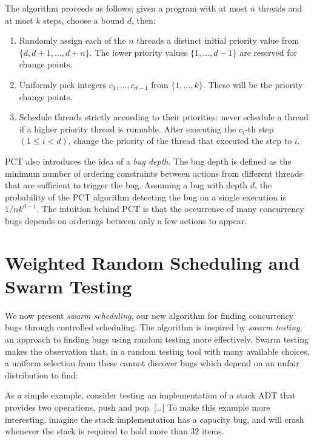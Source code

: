 The algorithm proceeds as follows; given a program with at most $n$
threads and at most $k$ steps, choose a bound $d$, then:

\begin{enumerate}
\item Randomly assign each of the $n$ threads a distinct initial priority value
  from $\{d, d + 1, \ldots, d+n\}$.  The lower priority values
  $\{1, \ldots, d−1\}$ are reserved for change points.
\item Uniformly pick integers $c_1, \ldots, c_{d−1}$ from $\{1, \ldots, k\}$.
  These will be the priority change points.
\item Schedule threads strictly according to their priorities: never schedule a
  thread if a higher priority thread is runnable.  After executing the $c_i$-th
  step $(1 \leq i < d)$, change the priority of the thread that executed the
  step to $i$.
\end{enumerate}

PCT also introduces the idea of a \emph{bug depth}.  The bug depth is
defined as the minimum number of ordering constraints between actions
from different threads that are sufficient to trigger the
bug\cite{burckhardt2010}.  Assuming a bug with depth $d$, the
probability of the PCT algorithm detecting the bug on a single
execution is $1/nk^{d−1}$.  The intuition behind PCT is that the
occurrence of many concurrency bugs depends on orderings between only
a few actions to appear.

\section{Weighted Random Scheduling and Swarm Testing}
\label{sec:algorithms-swarm}

We now present \emph{swarm scheduling}, our new algorithm for finding
concurrency bugs through controlled scheduling.  The algorithm is
inspired by \emph{swarm testing}\cite{groce2012}, an approach to
finding bugs using random testing more effectively.  Swarm testing
makes the observation that, in a random testing tool with many
available choices, a uniform selection from these cannot discover bugs
which depend on an unfair distribution to find:

\begin{displayquote}
  As a simple example, consider testing an implementation of a stack ADT that
  provides two operations, push and pop. [\ldots] To make this example more
  interesting, imagine the stack implementation has a capacity bug, and will
  crash whenever the stack is required to hold more than 32
  items.\cite{groce2012}
\end{displayquote}

